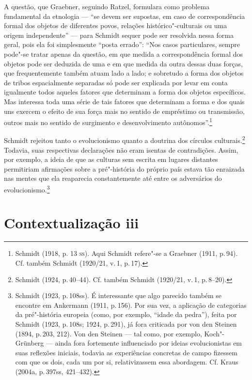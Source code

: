 A questão, que Graebner, seguindo Ratzel, formulara como problema
fundamental da etnologia --- ``se devem ser supostas, em caso de
correspondência formal dos objetos de diferentes povos, relações
histórico"-culturais ou uma origem independente'' --- para Schmidt sequer
pode ser resolvida nessa forma geral, pois ela foi simplesmente ``posta
errado'': ``Nos casos particulares, sempre pode"-se tratar apenas da
questão, em que medida a correspondência formal dos objetos pode ser
deduzida de uma e em que medida da outra dessas duas forças, que
frequentemente também atuam lado a lado; e sobretudo a forma dos objetos
de tribos espacialmente separadas só pode ser explicada por levar em
conta igualmente todos aqueles fatores que determinam a forma dos
objetos específicos. Mas interessa toda uma série de tais fatores que
determinam a forma e dos quais uns exercem o efeito de sua força mais no
sentido de empréstimo ou transmissão, outros mais no sentido de
surgimento e desenvolvimento autônomos''.\footnote{Schmidt (1918, p.
  13 \textsc{ss}). Aqui Schmidt refere"-se a Graebner (1911, p.\,94). Cf. também
  Schmidt (1920/21, v.\,1, p.\,17).}

Schmidt rejeitou tanto o evolucionismo quanto a doutrina dos círculos
culturais.\footnote{Schmidt (1924, p.\,40--44). Cf. também Schmidt
  (1920/21, v.\,1, p.\,8--20).} Todavia, suas respectivas declarações não
eram isentas de contradições. Assim, por exemplo, a ideia de que as
culturas sem escrita em lugares distantes permitiriam afirmações sobre a
pré"-história do próprio país estava tão enraizada nas mentes que ela
reaparecia constantemente até entre os adversários do
evolucionismo.\footnote{Schmidt (1923, p.\,108ss). É interessante que
  algo parecido também se encontre em Ankermann (1911, p.\,156). Por sua
  vez, a aplicação de categorias da pré"-história europeia (como, por
  exemplo, ``idade da pedra''), feita por Schmidt (1923, p.\,108s; 1924,
  p.\,291), já fora criticada por von den Steinen (1894, p.\,203, 212).
  Von den Steinen --- tal como, por exemplo, Koch"-Grünberg --- ainda fora
  fortemente influenciado por ideias evolucionistas em suas reflexões
  iniciais, todavia as experiências concretas de campo fizessem com que
  os dois, cada um por si, relativizassem essa abordagem. Cf. Kraus
  (2004a, p.\,397ss, 421--432).}

\section{Contextualização iii}

